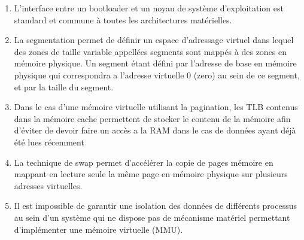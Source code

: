 \begin{enumerate}

\item L'interface entre un bootloader et un noyau de syst\`eme d'exploitation est standard et commune \`a toutes les architectures mat\'erielles.

\item La segmentation permet de d\'efinir un espace d'adressage virtuel dans lequel des zones de taille variable appell\'ees segments sont mapp\'es \`a des zones en m\'emoire physique. Un segment \'etant d\'efini par l'adresse de base en m\'emoire physique qui correspondra a l'adresse virtuelle 0 (zero) au sein de ce segment, et par la taille du segment.

\item Dans le cas d'une m\'emoire virtuelle utilisant la pagination, les TLB contenus dans la m\'emoire cache permettent de stocker le contenu de la m\'emoire afin d'\'eviter de devoir faire un acc\`es a la RAM dans le cas de donn\'ees ayant d\'ej\`a \'et\'e lues r\'ecemment

\item La technique de swap permet d'acc\'el\'erer la copie de pages m\'emoire en mappant en lecture seule la m\^eme page en m\'emoire physique sur plusieurs adresses virtuelles.

\item Il est impossible de garantir une isolation des donn\'ees de diff\'erents processus au sein d'un syst\`eme qui ne dispose pas de m\'ecanisme mat\'eriel permettant d'impl\'ementer une m\'emoire virtuelle (MMU).

\end{enumerate}


